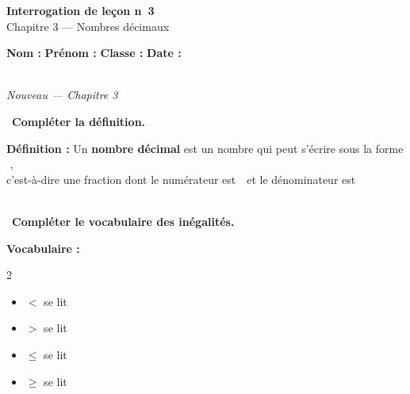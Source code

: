 \documentclass[a4paper,11pt]{article}
\newcommand{\bl}[1][4cm]{\,\makebox[#1]{\dotfill}\,}
\newcommand{\coeur}{\textcolor{Couleur8}{\faHeart}\ }
\begin{document}
\begin{mdframed}[linecolor=Couleur1,linewidth=2pt,topline=true,bottomline=true,leftline=false,rightline=false,innertopmargin=8pt,innerbottommargin=8pt,backgroundcolor=Couleur1!5]
\begin{center}
{\Large\bfseries\textcolor{Couleur1}{Interrogation de le\c{c}on n\degre~3}}\\[4pt]
{\large\textcolor{Couleur8}{Chapitre 3 --- Nombres d\'ecimaux}}
\end{center}
\end{mdframed}
\vspace{0.4cm}
\noindent\textbf{Nom :} \dotfill\quad\textbf{Pr\'enom :} \dotfill\quad\textbf{Classe :} \dotfill\quad\textbf{Date :} \dotfill
\vspace{0.5cm}

\vspace{0.3cm}
\noindent{\textcolor{Couleur8}{\rule{\textwidth}{0.5pt}}}\\
{\small\textit{\textcolor{Couleur8}{Nouveau --- Chapitre 3}}}
\vspace{0.1cm}

\noindent \coeur \textbf{Compl\'eter la d\'efinition.}
\begin{mdframed}[linecolor=Couleur6,linewidth=4pt,topline=false,bottomline=false,rightline=false,backgroundcolor=Couleur6!10,innerleftmargin=8pt,innertopmargin=6pt,innerbottommargin=6pt]
\textbf{\textcolor{Couleur6}{D\'efinition :}} Un \textbf{nombre d\'ecimal} est un nombre qui peut s'\'ecrire sous la forme \bl[4cm], \\
c'est-\`a-dire une fraction dont le num\'erateur est \bl[4cm] et le d\'enominateur est \bl[1cm] \\
\bl[4cm]
\end{mdframed}

\noindent \coeur \textbf{Compl\'eter le vocabulaire des in\'egalit\'es.}
\begin{mdframed}[linecolor=Couleur6,linewidth=4pt,topline=false,bottomline=false,rightline=false,backgroundcolor=Couleur6!10,innerleftmargin=8pt,innertopmargin=6pt,innerbottommargin=6pt]
\textbf{\textcolor{Couleur6}{Vocabulaire :}}
\vspace{-0.7cm}
\begin{multicols}{2}\begin{itemize}[label=\textcolor{Couleur6}{$\bullet$},nosep]
\item $<$ se lit \bl[3cm]
\item $>$ se lit \bl[3cm]
\item $\leq$ se lit \bl[3cm]
\item $\geq$ se lit \bl[3cm]
\end{itemize}\end{multicols}
\end{mdframed}
\end{document}
